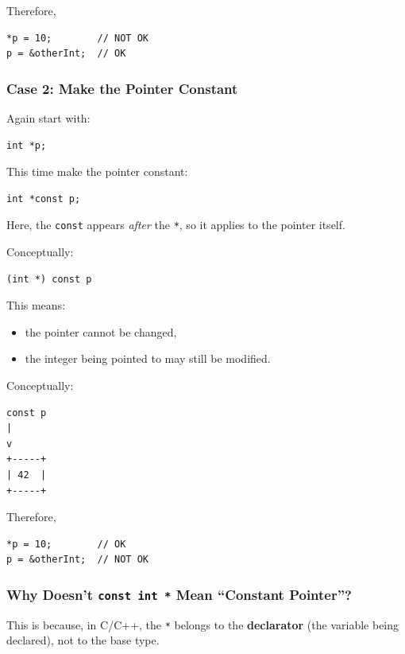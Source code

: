 \documentclass[10pt]{article}
\begin{document}
Therefore,

\begin{verbatim}
*p = 10;        // NOT OK
p = &otherInt;  // OK
\end{verbatim}

\subsubsection*{Case 2: Make the Pointer Constant}

Again start with:

\begin{verbatim}
int *p;
\end{verbatim}

This time make the pointer constant:

\begin{verbatim}
int *const p;
\end{verbatim}

Here, the \verb|const| appears \emph{after} the \verb|*|, so it applies to the pointer itself.

Conceptually:

\begin{verbatim}
(int *) const p
\end{verbatim}

This means:

\begin{itemize}
    \item the pointer cannot be changed,
    \item the integer being pointed to may still be modified.
\end{itemize}

Conceptually:

\begin{verbatim}
const p
|
v
+-----+
| 42  |
+-----+
\end{verbatim}

Therefore,

\begin{verbatim}
*p = 10;        // OK
p = &otherInt;  // NOT OK
\end{verbatim}

\subsubsection*{Why Doesn't \texttt{const int *} Mean ``Constant Pointer''?}

This is because, in C/C++, the \verb|*| belongs to the \textbf{declarator} (the variable being declared), not to the base type.
\end{document}
